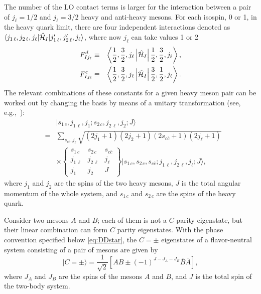 The number of the LO contact terms is larger for the interaction between a pair 
of $j_\ell=1/2$ and $j_\ell=3/2$ heavy and anti-heavy mesons.
For each isospin, 0 or 1, in the heavy quark limit, there are four independent 
interactions
denoted as $\langle
j_{1\, \ell},j_{2\, \ell},j_\ell|\hat{\mathcal{H}}_I |j_{1\, \ell}',j_{2\, \ell}',j_\ell
\rangle$, where now $j_\ell$ can take values 1 or 2
\begin{eqnarray}
  F_{Ij_\ell}^d &\equiv& \left\langle \frac12,\frac32,j_\ell \left|\hat{\mathcal{H}}_I 
\right|\frac12,\frac32,j_\ell \right\rangle , \nonumber\\
  F_{Ij_\ell}^c &\equiv& \left\langle \frac12,\frac32,j_\ell \left|\hat{\mathcal{H}}_I 
  \right|\frac32,\frac12,j_\ell \right\rangle .
  \label{eq:VHT}
\end{eqnarray}
The relevant combinations of these constants for a given heavy meson pair can 
be worked out by changing the basis by means of a unitary transformation
(see, e.g.,~\cite{Ohkoda:2012rj,Xiao:2013yca}):
\begin{eqnarray}
  &&| s_{1\,c},j_{1\, \ell},j_1; s_{2\,c},j_{2\, \ell},j_2;J\rangle \nonumber\\
  &=& \sum_{s_{c\bar c}, j_\ell }  
 \sqrt{ (2j_1+1)(2j_2+1) (2s_{c\bar c}+1)(2j_\ell+1) } \nonumber\\
 && \times 
 \begin{Bmatrix}
   s_{1\,c} & s_{2\,c} & s_{c\bar c} \\
   j_{1\, \ell} & j_{2\, \ell} & j_\ell \\
   j_1 & j_2 & J
 \end{Bmatrix}
 |s_{1\,c},s_{2\,c},s_{c\bar c};j_{1\, \ell},j_{2\, \ell},j_{\ell}; J\rangle ,
 ~~~
\end{eqnarray}
where $j_1$ and $j_2$ are the spins of the two heavy mesons, $J$ is the 
total angular momentum of the whole system, and
$s_{1\,c}$ and $s_{2\,c}$ are the spins of the heavy quark. 

Consider two mesons $A$ and $B$; each of them is not a $C$ parity eigenstate, but their linear combination can form $C$ parity eigenstates. With the phase convention specified below \eqref{eq:DDstar},
the $C=\pm$ eigenstates of a flavor-neutral system consisting of a pair of mesons are given by 
\begin{equation}
    |C=\pm \rangle=\frac{1}{\sqrt{2}}\left[A B \pm (-1)^{J-J_{A}-J_{B}} \bar B \bar A\right],
\end{equation}
where $J_A$ and $J_B$ are the spins of the mesons $A$ and $B$, and $J$ is the total spin of the two-body system.

